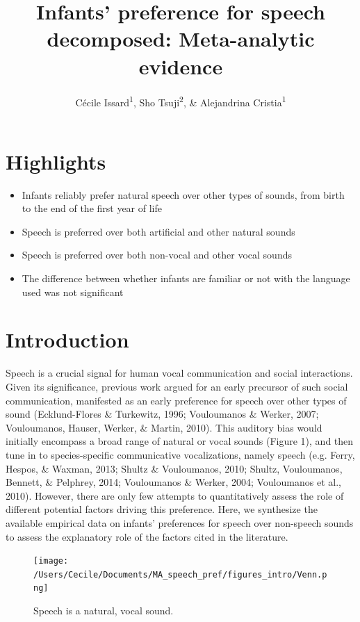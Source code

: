 \documentclass[man]{apa6}
\title{Infants' preference for speech decomposed: Meta-analytic evidence}
\author{Cécile Issard\textsuperscript{1}, Sho Tsuji\textsuperscript{2}, \&
Alejandrina Cristia\textsuperscript{1}}
\date{}
\affiliation{
\vspace{0.5cm}
\textsuperscript{1} Laboratoire de Sciences Cognitives et Psycholinguistique, Ecole Normale Supérieure, Département d'Études Cognitives\\\textsuperscript{2} International Research Center for Neurointelligence, The University of Tokyo}
\providecommand{\tightlist}{%
  \setlength{\itemsep}{0pt}\setlength{\parskip}{0pt}}
\begin{document}
\maketitle

\section{Highlights}\label{highlights}

\begin{itemize}
\tightlist
\item
  Infants reliably prefer natural speech over other types of sounds,
  from birth to the end of the first year of life
\item
  Speech is preferred over both artificial and other natural sounds
\item
  Speech is preferred over both non-vocal and other vocal sounds
\item
  The difference between whether infants are familiar or not with the
  language used was not significant
\end{itemize}

\section{Introduction}\label{introduction}

Speech is a crucial signal for human vocal communication and social
interactions. Given its significance, previous work argued for an early
precursor of such social communication, manifested as an early
preference for speech over other types of sound (Ecklund-Flores \&
Turkewitz, 1996; Vouloumanos \& Werker, 2007; Vouloumanos, Hauser,
Werker, \& Martin, 2010). This auditory bias would initially encompass a
broad range of natural or vocal sounds (Figure 1), and then tune in to
species-specific communicative vocalizations, namely speech (e.g. Ferry,
Hespos, \& Waxman, 2013; Shultz \& Vouloumanos, 2010; Shultz,
Vouloumanos, Bennett, \& Pelphrey, 2014; Vouloumanos \& Werker, 2004;
Vouloumanos et al., 2010). However, there are only few attempts to
quantitatively assess the role of different potential factors driving
this preference. Here, we synthesize the available empirical data on
infants' preferences for speech over non-speech sounds to assess the
explanatory role of the factors cited in the literature.

\begin{figure}
\centering
\texttt{[image: /Users/Cecile/Documents/MA\_speech\_pref/figures\_intro/Venn.png]}
\caption{\label{fig:unnamed-chunk-1}Speech is a natural, vocal sound.}
\end{figure}
\end{document}

